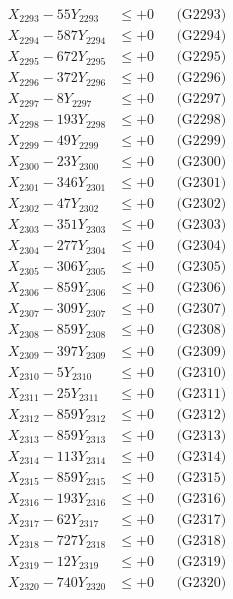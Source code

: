 \documentclass[a4paper,10pt]{article}
\begin{document}
{\begin{align}
X_{2293} - 55Y_{2293} &\leq +0 && \text{(G2293)} \\
X_{2294} - 587Y_{2294} &\leq +0 && \text{(G2294)} \\
X_{2295} - 672Y_{2295} &\leq +0 && \text{(G2295)} \\
X_{2296} - 372Y_{2296} &\leq +0 && \text{(G2296)} \\
X_{2297} - 8Y_{2297} &\leq +0 && \text{(G2297)} \\
X_{2298} - 193Y_{2298} &\leq +0 && \text{(G2298)} \\
X_{2299} - 49Y_{2299} &\leq +0 && \text{(G2299)} \\
X_{2300} - 23Y_{2300} &\leq +0 && \text{(G2300)} \\
\allowbreak
X_{2301} - 346Y_{2301} &\leq +0 && \text{(G2301)} \\
X_{2302} - 47Y_{2302} &\leq +0 && \text{(G2302)} \\
X_{2303} - 351Y_{2303} &\leq +0 && \text{(G2303)} \\
X_{2304} - 277Y_{2304} &\leq +0 && \text{(G2304)} \\
X_{2305} - 306Y_{2305} &\leq +0 && \text{(G2305)} \\
X_{2306} - 859Y_{2306} &\leq +0 && \text{(G2306)} \\
X_{2307} - 309Y_{2307} &\leq +0 && \text{(G2307)} \\
X_{2308} - 859Y_{2308} &\leq +0 && \text{(G2308)} \\
X_{2309} - 397Y_{2309} &\leq +0 && \text{(G2309)} \\
X_{2310} - 5Y_{2310} &\leq +0 && \text{(G2310)} \\
\allowbreak
X_{2311} - 25Y_{2311} &\leq +0 && \text{(G2311)} \\
X_{2312} - 859Y_{2312} &\leq +0 && \text{(G2312)} \\
X_{2313} - 859Y_{2313} &\leq +0 && \text{(G2313)} \\
X_{2314} - 113Y_{2314} &\leq +0 && \text{(G2314)} \\
X_{2315} - 859Y_{2315} &\leq +0 && \text{(G2315)} \\
X_{2316} - 193Y_{2316} &\leq +0 && \text{(G2316)} \\
X_{2317} - 62Y_{2317} &\leq +0 && \text{(G2317)} \\
X_{2318} - 727Y_{2318} &\leq +0 && \text{(G2318)} \\
X_{2319} - 12Y_{2319} &\leq +0 && \text{(G2319)} \\
X_{2320} - 740Y_{2320} &\leq +0 && \text{(G2320)} \\

\end{align}}
\end{document}
